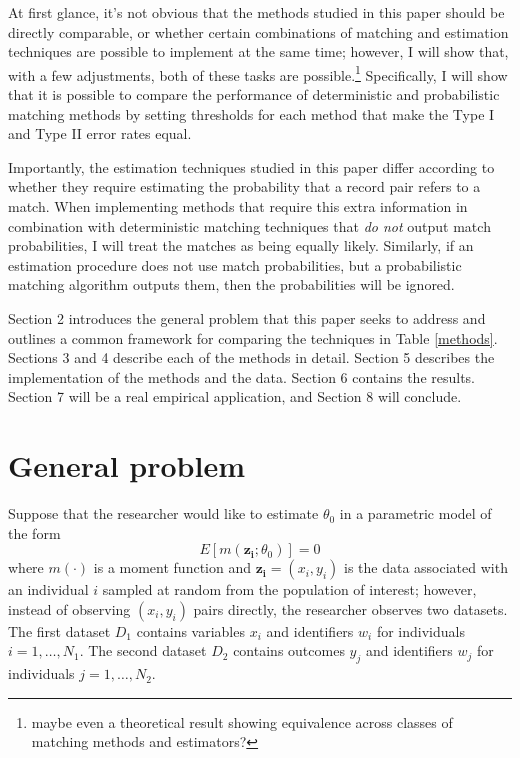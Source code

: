 \documentclass[12pt]{article}
\begin{document}
At first glance, it's not obvious that the methods studied in this paper should be directly comparable, or whether certain combinations of matching and estimation techniques are possible to implement at the same time; however, I will show that, with a few adjustments, both of these tasks are possible.\footnote{maybe even a theoretical result showing equivalence across classes of matching methods and estimators?}   Specifically, I will show that it is possible to compare the performance of deterministic and probabilistic matching methods by setting thresholds for each method that make the Type I and Type II error rates equal. 

Importantly, the estimation techniques studied in this paper differ according to whether they require estimating the probability that a record pair refers to a match.  When implementing methods that require this extra information in combination with deterministic matching techniques that \textit{do not} output match probabilities, I will treat the matches as being equally likely.  Similarly, if an estimation procedure does not use match probabilities, but a probabilistic matching algorithm outputs them, then the probabilities will be ignored.  

Section 2 introduces the general problem that this paper seeks to address and outlines a common framework for comparing the techniques in Table \ref{methods}.  Sections 3 and 4 describe each of the methods in detail. Section 5 describes the implementation of the methods and the data.  Section 6 contains the results.  Section 7 will be a real empirical application, and Section 8 will conclude.

\section{General problem}
Suppose that the researcher would like to estimate $\theta_0$ in a parametric model of the form
\begin{equation} E[m(\mathbf{z_i}; \theta_0)] = 0 \label{model} \end{equation}
where $m(\cdot)$ is a moment function and $\mathbf{z_i} = (x_i, y_i)$ is the data associated with an individual $i$ sampled at random from the population of interest; however, instead of observing $(x_i, y_i)$ pairs directly, the researcher observes two datasets.  The first dataset $D_1$ contains variables $x_i$ and identifiers $w_i$ for individuals $i = 1, \dots, N_1$.  The second dataset $D_2$ contains outcomes $y_j$ and identifiers $w_j$ for individuals $j=1,\dots, N_2$.
\end{document}
